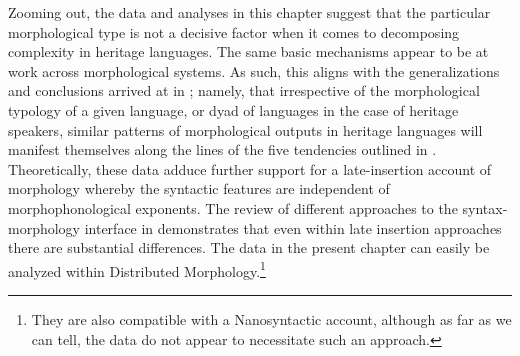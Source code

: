 \documentclass[output=paper,colorlinks,citecolor=brown,footheight=42pt]{langscibook}
\begin{document}
Zooming out, the data and analyses in this chapter suggest that the particular morphological type is not a decisive factor when it comes to decomposing complexity in heritage languages. The same basic mechanisms appear to be at work across morphological systems. As such, this aligns with the generalizations and conclusions arrived at in \citet{putnametal2021}; namely, that irrespective of the morphological typology of a given language, or dyad of languages in the case of heritage speakers, similar patterns of morphological outputs in heritage languages will manifest themselves along the lines of the five tendencies outlined in . Theoretically, these data adduce further support for a late-insertion account of morphology whereby the syntactic features are independent of morphophonological exponents. The review of different approaches to the syntax-morphology interface in  demonstrates that even within late insertion approaches there are substantial differences. The data in the present chapter can easily be analyzed within Distributed Morphology.\footnote{They are also compatible with a Nanosyntactic account, although as far as we can tell, the data do not appear to necessitate such an approach.}
\end{document}
